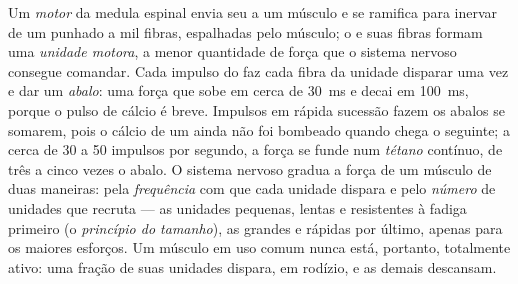 \begin{definition}\label{def:b2:muscle-movement:motorunit}
Um \emph{ motor} da medula espinal envia seu  a um
músculo e se ramifica para inervar de um punhado a mil fibras,
espalhadas pelo músculo; o  e suas fibras formam uma
\emph{unidade motora}, a menor quantidade de força que o sistema nervoso
consegue comandar. Cada impulso do  faz cada fibra da unidade
disparar uma vez e dar um \emph{abalo}: uma força que sobe em cerca de
\qty{30}{ms} e decai em \qty{100}{ms}, porque o pulso de cálcio é breve.
Impulsos em rápida sucessão fazem os abalos se somarem, pois o cálcio de
um ainda não foi bombeado quando chega o seguinte; a cerca de 30 a 50
impulsos por segundo, a força se funde num \emph{tétano} contínuo, de
três a cinco vezes o abalo. O sistema nervoso gradua a força de um
músculo de duas maneiras: pela \emph{frequência} com que cada unidade
dispara e pelo \emph{número} de unidades que recruta --- as unidades
pequenas, lentas e resistentes à fadiga primeiro (o \emph{princípio do
tamanho}), as grandes e rápidas por último, apenas para os maiores
esforços. Um músculo em uso comum nunca está, portanto, totalmente
ativo: uma fração de suas unidades dispara, em rodízio, e as demais
descansam.
\end{definition}

